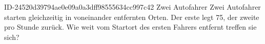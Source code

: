 \begin{exercise}
      {ID-24520d39794ae0e09a0a3dff98555634cc997c42}
      {Zwei Autofahrer}
  \ifproblem\problem
    Zwei Autofahrer starten gleichzeitig in  voneinander entfernten Orten.
    Der erste legt 75, der zweite  pro Stunde zurück. Wie weit vom
    Startort des ersten Fahrers entfernt treffen sie sich?
  \fi
\end{exercise}
